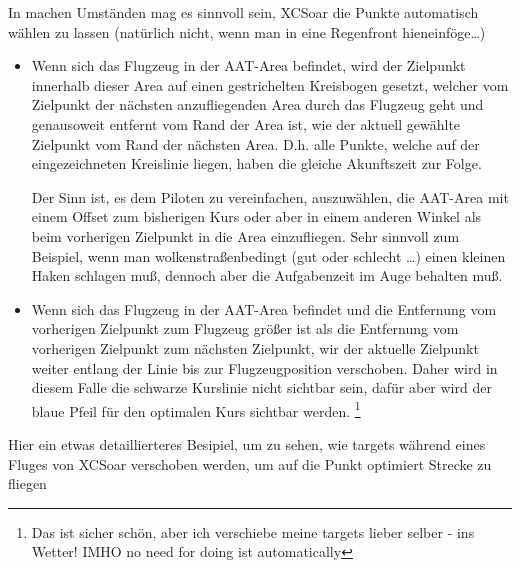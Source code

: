 In machen Umständen mag es sinnvoll sein, \textsf{XCSoar} die Punkte automatisch wählen zu lassen (natürlich nicht, wenn man in eine Regenfront hieneinföge\dots)
\begin{itemize}
\item Wenn sich das Flugzeug  in der AAT-Area befindet, wird der Zielpunkt innerhalb dieser Area auf einen gestrichelten
Kreisbogen  gesetzt, welcher vom Zielpunkt der nächsten anzufliegenden Area durch das Flugzeug geht und genausoweit entfernt vom Rand der Area ist,
wie der aktuell gewählte Zielpunkt vom Rand der  nächsten Area. D.h. alle Punkte, welche auf der eingezeichneten
Kreislinie liegen, haben die gleiche Akunftszeit zur Folge.

Der Sinn ist, es dem Piloten zu vereinfachen, auszuwählen, die AAT-Area mit einem Offset zum bisherigen Kurs oder aber in einem
anderen Winkel als beim vorherigen Zielpunkt in die Area einzufliegen. Sehr sinnvoll zum Beispiel, wenn man wolkenstraßenbedingt (gut oder schlecht \dots )
einen kleinen Haken schlagen muß, dennoch aber die Aufgabenzeit im Auge behalten muß.


\item Wenn sich das Flugzeug in der AAT-Area befindet und die Entfernung vom vorherigen Zielpunkt zum Flugzeug größer ist als die Entfernung vom vorherigen Zielpunkt zum nächsten Zielpunkt, wir der aktuelle Zielpunkt weiter entlang der Linie  bis zur Flugzeugposition verschoben.  Daher wird in diesem Falle die schwarze Kurslinie  nicht sichtbar sein, dafür aber wird der blaue Pfeil für den optimalen Kurs sichtbar werden. \footnote{Das ist sicher schön, aber ich verschiebe meine targets lieber selber - ins Wetter! IMHO no need for doing ist automatically}

\end{itemize}

Hier ein etwas detaillierteres Besipiel, um zu sehen, wie targets während  eines Fluges von \textsf{XCSoar} verschoben werden, um auf die Punkt optimiert Strecke zu fliegen

